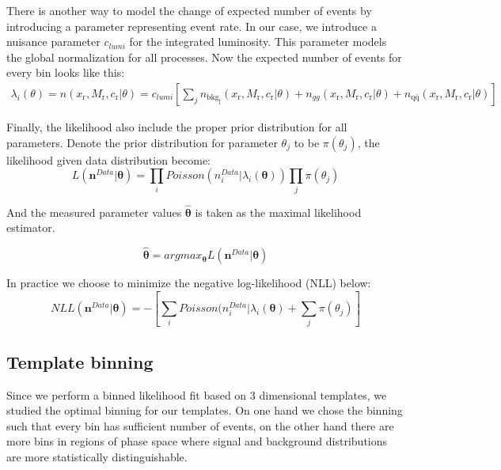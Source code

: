 \documentclass{cmspaperpdf}
\begin{document}
There is another way to model the change of expected number of events by introducing a parameter representing event rate. In our case, we introduce a nuisance parameter $c_{lumi}$ for the integrated luminosity. This parameter models the global normalization for all processes. Now the expected number of events for every bin looks like this:
\begin{align}
\lambda_i(\theta)= n(x_\mathrm{r},M_\mathrm{r},c_\mathrm{r}|\theta) =c_{lumi}\left[\sum_j n_\mathrm{bkg_j}(x_\mathrm{r},M_\mathrm{r},c_\mathrm{r}|\theta)+n_{gg}(x_\mathrm{r},M_\mathrm{r},c_\mathrm{r}|\theta) +n_\mathrm{q\bar{q}}(x_\mathrm{r}, M_\mathrm{r}, c_\mathrm{r}|\theta) \right]
\label{eq:theta_exp_evts}
\end{align}

Finally, the likelihood also include the proper prior distribution for all parameters. Denote the prior distribution for parameter $\theta_j$ to be $\pi(\theta_j)$, the likelihood given data distribution become:
\begin{equation}
L(\bm{n}^{Data}|\bm \theta )=\prod_i Poisson(n_i^{Data}|\lambda_i(\bm{\theta}))\prod_j \pi(\theta_j)
\label{eq:theta_likelihood}
\end{equation}

And the measured parameter values $\bm{\hat{\theta}}$ is taken as the maximal likelihood estimator.

\begin{equation}
\bm{\hat{\theta}} = argmax_{\bm{\theta}}L(\bm{n}^{Data}|\bm{\theta})
\end{equation}

In practice we choose to minimize the negative log-likelihood (NLL) below:
\begin{equation}
NLL(\bm n^{Data}|\bm \theta) = - \left[ \sum_i Poisson(n_i^{Data}|\lambda_i(\bm{\theta}) + \sum_j \pi(\theta_j) \right]
\label{eq:NLL}
\end{equation}

\subsection{Template binning} 
Since we perform a binned likelihood fit based on 3 dimensional templates, we studied the optimal binning for our templates. On one hand we chose the binning such that every bin has sufficient number of events, on the other hand there are more bins in regions of phase space where signal and background distributions are more statistically distinguishable. 
\end{document}
